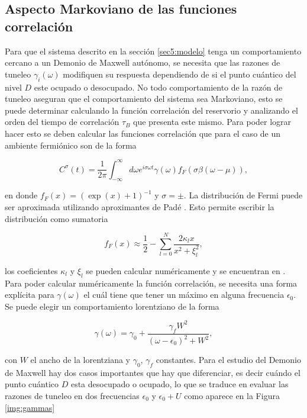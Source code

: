 \begin{appendixs}
\subsection{Aspecto Markoviano de las funciones correlación }
Para que el sistema descrito en la sección \ref{sec5:modelo} tenga un comportamiento cercano a un Demonio de Maxwell autónomo, se necesita que las razones de tuneleo $\gamma_{i}(\omega)$ modifiquen su respuesta dependiendo de si el punto cuántico del nivel $D$ este ocupado o desocupado. No todo comportamiento de la razón de tuneleo aseguran que el comportamiento del sistema sea Markoviano, esto se puede determinar calculando la función correlación del reservorio y analizando el orden del tiempo de correlación $\tau_{B}$ que presenta este mismo. Para poder lograr hacer esto se deben calcular las funciones correlación que para el caso de un ambiente fermiónico son de la forma

\begin{equation*}
    C^{\sigma}(t) = \frac{1}{2\pi} \int_{-\infty}^{\infty} d\omega e^{i\sigma \omega t} \gamma(\omega) f_{F}(\sigma \beta(\omega-\mu)),
\end{equation*}

en donde $f_{F}(x) = (\exp(x)+1)^{-1}$ y $\sigma = \pm$. La distribución de Fermi puede ser aproximada utilizando aproximantes de Padé \cite{hu2011pade,schinabeck2019hierarchical}. Esto permite escribir la distribución como sumatoria

\begin{equation}
    f_{F}(x) \approx \frac{1}{2} - \sum_{l=0}^{N} \frac{ 2 \kappa_{l}x }{ x^{2} + \xi^{2}_{l} },
    \label{apendix5:pade}
\end{equation}

los coeficientes $\kappa_{l}$ y $\xi_{l}$ se pueden calcular numéricamente y se encuentran en \cite{hu2011pade}. Para poder calcular numéricamente la función correlación, se necesita una forma explícita para $\gamma(\omega)$ el cuál tiene que tener un máximo en alguna frecuencia $\epsilon_{0}$. Se puede elegir un comportamiento lorentziano de la forma

\begin{equation*}
    \gamma(\omega) = \gamma_{0} + \frac{\gamma_{f} W^{2}}{(\omega - \epsilon_{0})^{2} + W^{2}},
\end{equation*}

con $W$ el ancho de la lorentziana y $\gamma_{0}$, $\gamma_{f}$ constantes. Para el estudio del Demonio de Maxwell hay dos casos importantes que hay que diferenciar, es decir cuándo el punto cuántico $D$ esta desocupado o ocupado, lo que se traduce en evaluar las razones de tuneleo en dos frecuencias $\epsilon_{0}$ y $\epsilon_{0}+U$ como aparece en la Figura \ref{img:gammas}


\end{appendixs}
